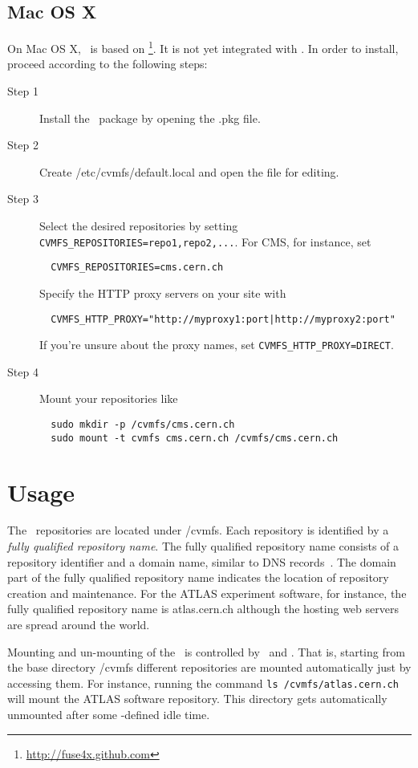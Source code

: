 \subsection{Mac OS X}
On Mac OS X, \cvmfs\ is based on \fusex\footnote{\url{http://fuse4x.github.com}}. 
It is not yet integrated with \autofs.
In order to install, proceed according to the following steps:
\begin{description}
	\item[Step 1] Install the \cvmfs\ package by opening the .pkg file.
	\item[Step 2] Create /etc/cvmfs/default.local and open the file for editing.
	\item[Step 3] Select the desired repositories by setting \texttt{CVMFS\_REPOSITORIES=repo1,repo2,...}.
		For CMS, for instance, set 
\begin{verbatim}
  CVMFS_REPOSITORIES=cms.cern.ch
\end{verbatim}
		Specify the HTTP proxy servers on your site with
\begin{verbatim}
  CVMFS_HTTP_PROXY="http://myproxy1:port|http://myproxy2:port"
\end{verbatim}
	If you're unsure about the proxy names, set \texttt{CVMFS\_HTTP\_PROXY=DIRECT}.
    \item[Step 4] Mount your repositories like
\begin{verbatim} 
  sudo mkdir -p /cvmfs/cms.cern.ch
  sudo mount -t cvmfs cms.cern.ch /cvmfs/cms.cern.ch
\end{verbatim}
\end{description}

\section{Usage}
The \cvmfs\ repositories are located under /cvmfs.
Each repository is identified by a \emph{fully qualified repository name}.
The fully qualified repository name consists of a repository identifier and a domain name, similar to DNS records~\cite{rfc1035}.
The domain part of the fully qualified repository name indicates the location of repository creation and maintenance.
For the ATLAS experiment software, for instance, the fully qualified repository name is atlas.cern.ch although the hosting web servers are spread around the world.

Mounting and un-mounting of the \cvmfs\ is controlled by \autofs\ and .
That is, starting from the base directory /cvmfs different repositories are mounted automatically just by accessing them.
For instance, running the command \texttt{ls /cvmfs/atlas.cern.ch} will mount the ATLAS software repository.
This directory gets automatically unmounted after some -defined idle time.


